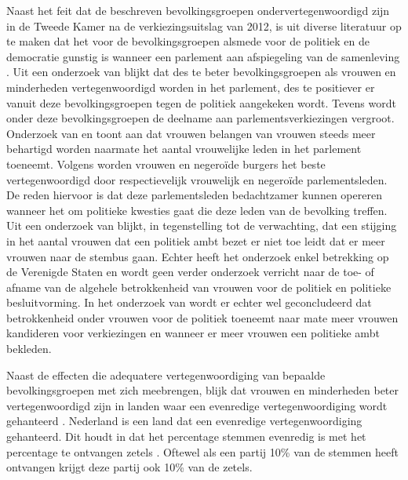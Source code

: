 Naast het feit dat de beschreven bevolkingsgroepen ondervertegenwoordigd zijn in de Tweede Kamer na de verkiezingsuitslag van 2012, is uit diverse literatuur op te maken dat het voor de bevolkingsgroepen alsmede voor de politiek en de democratie gunstig is wanneer een parlement aan afspiegeling van de samenleving  \citep{tremblay1998female,anwar2001participation}. Uit een onderzoek van \cite{banducci2004minority} blijkt dat des te beter bevolkingsgroepen als vrouwen en minderheden vertegenwoordigd worden in het parlement, des te positiever er vanuit deze bevolkingsgroepen tegen de politiek aangekeken wordt. Tevens wordt onder deze bevolkingsgroepen de deelname aan parlementsverkiezingen vergroot. Onderzoek van \cite{wangnerud2009women} en \cite{sainsbury2004women} toont aan dat vrouwen belangen van vrouwen steeds meer behartigd worden naarmate het aantal vrouwelijke leden in het parlement toeneemt. Volgens \cite{mansbridge1999should} worden vrouwen en negeroïde burgers het beste vertegenwoordigd door respectievelijk vrouwelijk en negeroïde parlementsleden. De reden hiervoor is dat deze parlementsleden bedachtzamer kunnen opereren wanneer het om politieke kwesties gaat die deze leden van de bevolking treffen. Uit een onderzoek van \cite{broockman2014female} blijkt, in tegenstelling tot de verwachting, dat een stijging in het aantal vrouwen dat een politiek ambt bezet er niet toe leidt dat er meer vrouwen naar de stembus gaan. Echter heeft het onderzoek enkel betrekking op de Verenigde Staten en wordt geen verder onderzoek verricht naar de toe- of afname van de algehele betrokkenheid van vrouwen voor de politiek en politieke besluitvorming. In het onderzoek van \cite{karp2008politics} wordt er echter wel geconcludeerd dat betrokkenheid onder vrouwen voor de politiek toeneemt naar mate meer vrouwen kandideren voor verkiezingen en wanneer er meer vrouwen een politieke ambt bekleden. 

Naast de effecten die adequatere vertegenwoordiging van bepaalde bevolkingsgroepen met zich meebrengen, blijk dat vrouwen en minderheden beter vertegenwoordigd zijn in landen waar een evenredige vertegenwoordiging wordt gehanteerd \cite{macivor1999proportional,mcallister2002electoral,studlar1999will,welch1990multi}.  Nederland is een land dat een evenredige vertegenwoordiging gehanteerd. Dit houdt in dat het percentage stemmen evenredig is met het percentage te ontvangen zetels \cite{Kiess35:online}. Oftewel als een partij 10\% van de stemmen heeft ontvangen krijgt deze partij ook 10\% van de zetels.

